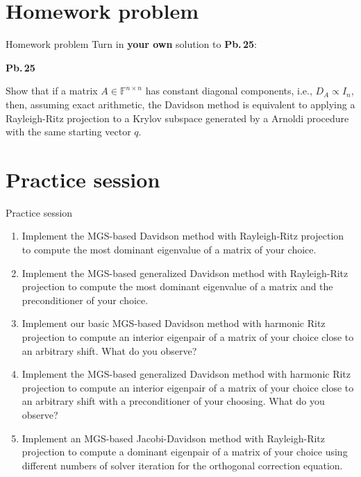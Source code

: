\documentclass[t,usepdftitle=false]{beamer}
\begin{document}
\section{Homework problem}

\begin{frame}{Homework problem}\vspace{.1cm}
Turn in \textbf{your own} solution to \textbf{Pb.$\,$25}:\vspace{.15cm}\\
\begin{minipage}[t]{0.1\textwidth}
\textbf{Pb.$\,$25}
\end{minipage}
\begin{minipage}[t]{0.89\textwidth}
Show that if a matrix $A\in\mathbb{F}^{n\times n}$ has constant diagonal components, i.e., $D_A\propto I_n$, then, assuming exact arithmetic, the Davidson method is equivalent to applying a Rayleigh-Ritz projection to a Krylov subspace generated by a Arnoldi procedure with the same starting vector $q$.
\end{minipage}
\end{frame}

\section{Practice session}
\begin{frame}[fragile]{Practice session}
\begin{enumerate}
\item Implement the MGS-based Davidson method with Rayleigh-Ritz projection to compute the most dominant eigenvalue of a matrix of your choice.
\item Implement the MGS-based generalized Davidson method with Rayleigh-Ritz projection to compute the most dominant eigenvalue of a matrix and the preconditioner of your choice.
\item Implement our basic MGS-based Davidson method with harmonic Ritz projection to compute an interior eigenpair of a matrix of your choice close to an arbitrary shift.
What do you observe?
\item Implement the MGS-based generalized Davidson method with harmonic Ritz projection to compute an interior eigenpair of a matrix of your choice close to an arbitrary shift with a preconditioner of your choosing.
What do you observe?
\item Implement an MGS-based Jacobi-Davidson method with Rayleigh-Ritz projection to compute a dominant eigenpair of a matrix of your choice using different numbers of solver iteration for the orthogonal correction equation.
\end{enumerate}
\end{frame}
\end{document}
